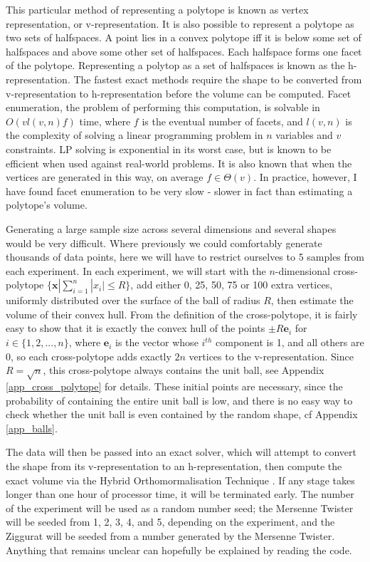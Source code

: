 This particular method of representing a polytope is known as vertex representation, or v-representation. It is also possible to represent a polytope as two sets of halfspaces. A point lies in a convex polytope iff it is below some set of halfspaces and above some other set of halfspaces. Each halfspace forms one facet of the polytope. Representing a polytop as a set of halfspaces is known as the h-representation. The fastest exact methods require the shape to be converted from v-representation to h-representation before the volume can be computed. Facet enumeration, the problem of performing this computation, is solvable in $O(vl(v,n)f)$ time\cite{Fukuda97}, where $f$ is the eventual number of facets, and $l(v,n)$ is the complexity of solving a linear programming problem in $n$ variables and $v$ constraints. LP solving is exponential in its worst case\cite{Klee72}, but is known to be efficient when used against real-world problems. It is also known that when the vertices are generated in this way, on average $f \in \Theta(v)$. In practice, however, I have found facet enumeration to be very slow - slower in fact than estimating a polytope's volume.

Generating a large sample size across several dimensions and several shapes would be very difficult. Where previously we could comfortably generate thousands of data points, here we will have to restrict ourselves to 5 samples from each experiment. In each experiment, we will start with the $n$-dimensional cross-polytope $\{{\bm x} | \sum^n_{i=1}|x_i| \leqslant R\}$, add either 0, 25, 50, 75 or 100 extra vertices, uniformly distributed over the surface of the ball of radius $R$, then estimate the volume of their convex hull. From the definition of the cross-polytope, it is fairly easy to show that it is exactly the convex hull of the points $\pm R{\bm e}_i$ for $i \in \{1,2,...,n\}$, where ${\bm e}_i$ is the vector whose $i^{th}$ component is 1, and all others are 0, so each cross-polytope adds exactly $2n$ vertices to the v-representation. Since $R=\sqrt{n}$, this cross-polytope always contains the unit ball, see Appendix \ref{app_cross_polytope} for details. These initial points are necessary, since the probability of containing the entire unit ball is low, and there is no easy way to check whether the unit ball is even contained by the random shape, cf Appendix \ref{app_balls}.

The data will then be passed into an exact solver, which will attempt to convert the shape from its v-representation to an h-representation, then compute the exact volume via the Hybrid Orthomormalisation Technique \cite{Bueler98}. If any stage takes longer than one hour of processor time, it will be terminated early. The number of the experiment will be used as a random number seed; the Mersenne Twister will be seeded from 1, 2, 3, 4, and 5, depending on the experiment, and the Ziggurat will be seeded from a number generated by the Mersenne Twister. Anything that remains unclear can hopefully be explained by reading the code. %


